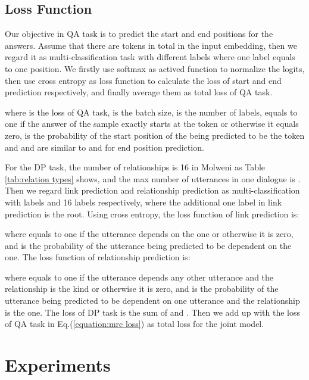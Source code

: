 \documentclass[11pt]{article}
\begin{document}
\subsection{Loss Function}\label{subsec:loss}
Our objective in QA task is to predict the start and end positions for the answers. Assume that there are  tokens in total in the input embedding, then we regard it as multi-classification task with  different labels where one label equals to one position. We firstly use softmax as actived function to normalize the logits, then use cross entropy as loss function to calculate the loss of start and end prediction respectively, and finally average them as total loss of QA task.

where  is the loss of QA task,  is the batch size,  is the number of labels,  equals to one if the answer of the  sample exactly starts at the  token or otherwise it equals zero,  is the probability of the start position of the  being predicted to be the  token and  and  are similar to  and  for end position prediction.

For the DP task, the number of relationships is 16 in Molweni as Table \ref{tab:relation types} shows, and the max number of utterances in one dialogue is . Then we regard link prediction and relationship prediction as multi-classification with  labels and 16 labels respectively, where the additional one label in link prediction is the root. Using cross entropy, the loss function of link prediction  is:

where  equals to one if the  utterance depends on the  one or otherwise it is zero, and  is the probability of the  utterance being predicted to be dependent on the  one. The loss function of relationship prediction  is:

where  equals to one if the  utterance depends any other utterance and the relationship is the  kind or otherwise it is zero, and  is the probability of the  utterance being predicted to be dependent on one utterance and the relationship is the  one. The loss of DP task  is the sum of  and . Then we add up  with the loss of QA task in Eq.(\ref{equation:mrc loss}) as total loss  for the joint model.


\section{Experiments}\label{sec:experiments}
\end{document}
